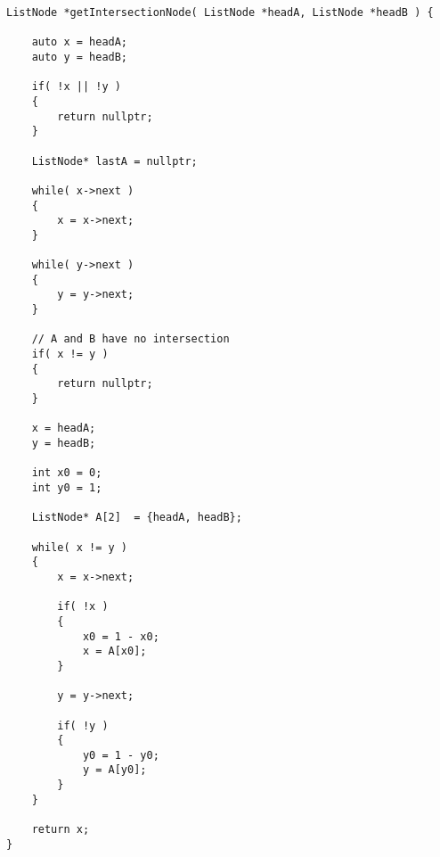 \begin{lstlisting}[style=customc, caption={Reference Code}]
ListNode *getIntersectionNode( ListNode *headA, ListNode *headB ) {

    auto x = headA;
    auto y = headB;

    if( !x || !y )
    {
        return nullptr;
    }

    ListNode* lastA = nullptr;

    while( x->next )
    {
        x = x->next;
    }

    while( y->next )
    {
        y = y->next;
    }

	// A and B have no intersection
    if( x != y )
    {
        return nullptr;
    }

    x = headA;
    y = headB;

    int x0 = 0;
    int y0 = 1;

    ListNode* A[2]  = {headA, headB};

    while( x != y )
    {
        x = x->next;

        if( !x )
        {
            x0 = 1 - x0;
            x = A[x0];
        }

        y = y->next;

        if( !y )
        {
            y0 = 1 - y0;
            y = A[y0];
        }
    }

    return x;
}
\end{lstlisting}